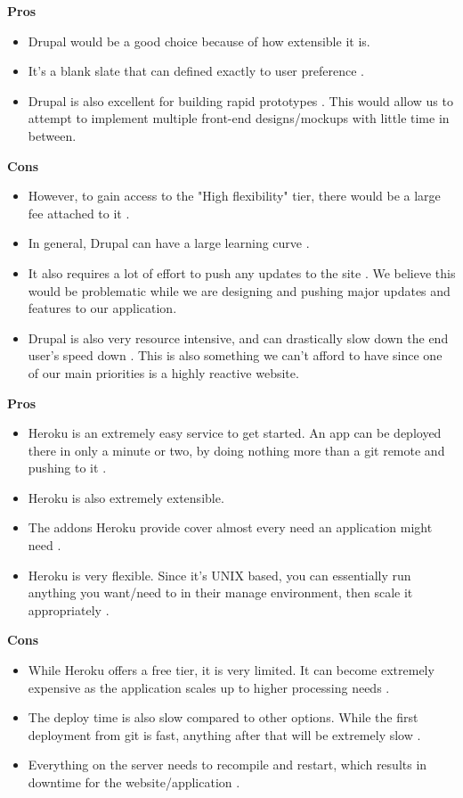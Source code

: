 		\textbf{Pros} 
			\begin{itemize}
				\item Drupal would be a good choice because of how extensible it is. 
				\item It's a blank slate that can defined exactly to user preference \cite{drupalPC}. 
				\item Drupal is also excellent for building rapid prototypes \cite{drupalPC}. This would allow us to attempt to implement multiple front-end designs/mockups with little time in between.
			\end{itemize}
		\textbf{Cons}
			\begin{itemize}
				\item However, to gain access to the "High flexibility" tier, there would be a large fee attached to it \cite{drupalOSU}. 
				\item In general, Drupal can have a large learning curve \cite{drupalPC}. 
				\item It also requires a lot of effort to push any updates to the site \cite{drupalPC}. We believe this would be problematic while we are designing and pushing major updates and features to our application. 
				\item Drupal is also very resource intensive, and can drastically slow down the end user's speed down \cite{drupalPC}. This is also something we can't afford to have since one of our main priorities is a highly reactive website.
			\end{itemize}
			
		\textbf{Pros} 
			\begin{itemize}
				\item Heroku is an extremely easy service to get started. An app can be deployed there in only a minute or two, by doing nothing more than a git remote and pushing to it \cite{heroku}. 
				\item Heroku is also extremely extensible.
				\item The addons Heroku provide cover almost every need an application might need \cite{heroku}. 
				\item Heroku is very flexible. Since it's UNIX based, you can essentially run anything you want/need to in their manage environment, then scale it appropriately \cite{heroku}.
			\end{itemize}
		\textbf{Cons}
			\begin{itemize}
				\item While Heroku offers a free tier, it is very limited. It can become extremely expensive as the application scales up to higher processing needs \cite{heroku}. 
				\item The deploy time is also slow compared to other options. While the first deployment from git is fast, anything after that will be extremely slow \cite{heroku}. 
				\item Everything on the server needs to recompile and restart, which results in downtime for the website/application \cite{heroku}.
			\end{itemize}
			
